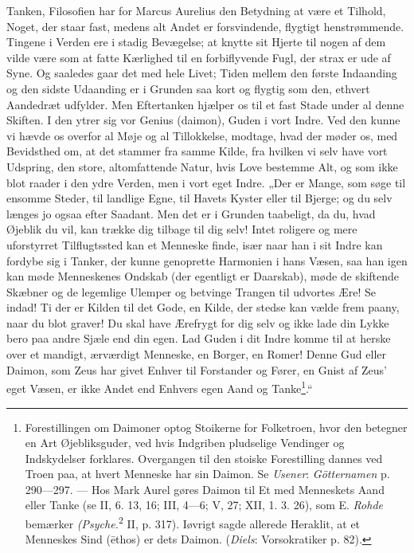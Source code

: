 \documentclass[12pt,a4paper,openany]{book}
\newcommand{\opage}[1]{\marginnote{\footnotesize\textit{[#1]}}}
\begin{document}
Tanken, Filosofien har for Marcus Aurelius den Betydning
at være et Tilhold, Noget, der staar fast, medens alt Andet er
forsvindende, flygtigt henstrømmende. Tingene i Verden ere i
stadig Bevægelse; at knytte sit Hjerte til nogen af dem vilde
være som at fatte Kærlighed til en forbiflyvende Fugl, der
strax er ude af Syne. Og saaledes gaar det med hele Livet;
Tiden mellem den første Indaanding og den sidste Udaanding
er i Grunden saa kort og flygtig som den, ethvert Aandedræt
udfylder. Men Eftertanken hjælper os til et fast Stade under
al denne Skiften. I den ytrer sig vor Genius (daimon), Guden
i vort Indre. Ved den kunne vi hævde os overfor al Møje og
al Tillokkelse, modtage, hvad der møder os, med Bevidsthed om,
at det stammer fra samme Kilde, fra hvilken vi selv have vort
Udspring, den store, altomfattende Natur, hvis Love bestemme
Alt, og som ikke blot raader i den ydre Verden, men i vort
eget Indre. „Der er Mange, som søge til ensomme Steder, til
\setcounter{footnote}{0}%
\opage{111}landlige Egne, til Havets Kyster eller til Bjerge; og du selv
længes jo ogsaa efter Saadant. Men det er i Grunden taabeligt,
da du, hvad Øjeblik du vil, kan trække dig tilbage til dig
selv! Intet roligere og mere uforstyrret Tilflugtssted kan et
Menneske finde, især naar han i sit Indre kan fordybe sig i
Tanker, der kunne genoprette Harmonien i hans Væsen, saa
han igen kan møde Menneskenes Ondskab (der egentligt er
Daarskab), møde de skiftende Skæbner og de legemlige Ulemper
og betvinge Trangen til udvortes Ære! Se indad! Ti der er
Kilden til det Gode, en Kilde, der stedse kan vælde frem
paany, naar du blot graver! Du skal have Ærefrygt for dig
selv og ikke lade din Lykke bero paa andre Sjæle end din
egen. Lad Guden i dit Indre komme til at herske over et
mandigt, ærværdigt Menneske, en Borger, en Romer! Denne
Gud eller Daimon, som Zeus har givet Enhver til Forstander
og Fører, en Gnist af Zeus’ eget Væsen, er ikke Andet end
Enhvers egen Aand og Tanke\footnote[1]{Forestillingen om Daimoner optog Stoikerne for Folketroen, hvor den betegner en Art Øjebliksguder, ved hvis Indgriben pludselige Vendinger og Indskydelser forklares. Overgangen til den stoiske Forestilling dannes ved Troen paa, at hvert Menneske har sin Daimon. Se \emph{Usener}: \textit{Götternamen} p. 290---297. --- Hos Mark Aurel gøres Daimon til Et med Menneskets Aand eller Tanke (se II, 6. 13, 16; III, 4---6; V, 27; XII, 1. 3. 26), som E. \emph{Rohde} bemærker \textit{(Psyche.}\textsuperscript{2} II, p. 317). Iøvrigt sagde allerede Heraklit, at et Menneskes Sind (ēthos) er dets Daimon. (\emph{Diels}: Vorsokratiker p. 82).}.“
\end{document}
